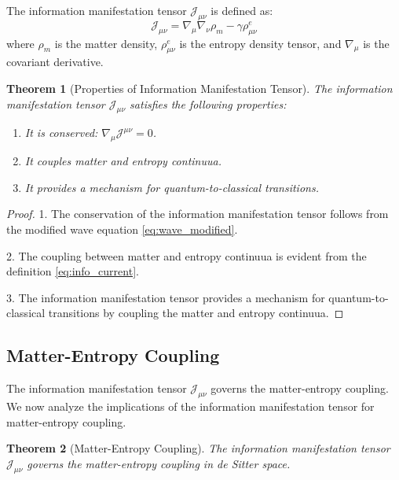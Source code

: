 \documentclass[11pt,english,twoside]{article}
\theoremstyle{plain}
\newtheorem{theorem}{Theorem}[section]
\theoremstyle{definition}
\theoremstyle{remark}
\newcommand{\J}{{\mathcal{J}}}
\newcommand{\gammaR}{\gamma}
\begin{document}
The information manifestation tensor $\J_{\mu\nu}$ is defined as:
\begin{equation}
\label{eq:info_current}
\J_{\mu\nu} = \nabla_{\mu}\nabla_{\nu}\rho_m - \gammaR\rho_{\mu\nu}^e
\end{equation}
where $\rho_m$ is the matter density, $\rho_{\mu\nu}^e$ is the entropy density tensor, and $\nabla_{\mu}$ is the covariant derivative.

\begin{theorem}[Properties of Information Manifestation Tensor]
\label{thm:info_current_properties}
The information manifestation tensor $\J_{\mu\nu}$ satisfies the following properties:
\begin{enumerate}
\item It is conserved: $\nabla_{\mu}\J^{\mu\nu} = 0$.
\item It couples matter and entropy continuua.
\item It provides a mechanism for quantum-to-classical transitions.
\end{enumerate}
\end{theorem}

\begin{proof}
1. The conservation of the information manifestation tensor follows from the modified wave equation \eqref{eq:wave_modified}.

2. The coupling between matter and entropy continuua is evident from the definition \eqref{eq:info_current}.

3. The information manifestation tensor provides a mechanism for quantum-to-classical transitions by coupling the matter and entropy continuua.
\end{proof}

\subsection{Matter-Entropy Coupling}
\label{subsec:matter_entropy_coupling}

The information manifestation tensor $\J_{\mu\nu}$ governs the matter-entropy coupling. We now analyze the implications of the information manifestation tensor for matter-entropy coupling.

\begin{theorem}[Matter-Entropy Coupling]
\label{thm:matter_entropy_coupling}
The information manifestation tensor $\J_{\mu\nu}$ governs the matter-entropy coupling in de Sitter space.
\end{theorem}
\end{document}
